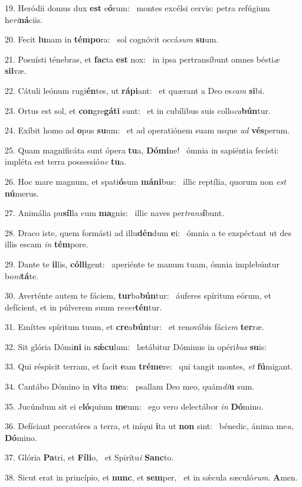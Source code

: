 19. Heródii domus dux \textbf{est} e\textbf{ó}rum: \ast\  montes excélsi cervis: petra refúgium he\textit{ri}\textbf{ná}ciis.\

20. Fecit \textbf{lu}nam in \textbf{tém}\textbf{po}ra: \ast\  sol cognóvit occá\textit{sum} \textbf{su}um.\

21. Posuísti ténebras, et \textbf{fac}ta \textbf{est} nox: \ast\  in ipsa pertransíbunt omnes bésti\textit{æ} \textbf{sil}væ.\

22. Cátuli leónum rugi\textbf{én}tes, ut \textbf{rá}\textbf{pi}ant: \ast\  et quærant a Deo es\textit{cam} \textbf{si}bi.\

23. Ortus est sol, et \textbf{con}gre\textbf{gá}\textbf{ti} sunt: \ast\  et in cubílibus suis collo\textit{ca}\textbf{bún}tur.\

24. Exíbit homo ad \textbf{o}pus \textbf{su}um: \ast\  et ad operatiónem suam usque \textit{ad} \textbf{vés}perum.\

25. Quam magnificáta sunt ópera \textbf{tu}a, \textbf{Dó}\textbf{mi}ne! \ast\  ómnia in sapiéntia fecísti: impléta est terra possessió\textit{ne} \textbf{tu}a.\

26. Hoc mare magnum, et spati\textbf{ó}sum \textbf{má}\textbf{ni}bus: \ast\  illic reptília, quorum non \textit{est} \textbf{nú}merus.\

27. Animália pu\textbf{síl}la cum \textbf{ma}gnis: \ast\  illic naves per\textit{trans}\textbf{í}bunt.\

28. Draco iste, quem formásti ad illu\textbf{dén}dum \textbf{e}i: \ast\  ómnia a te exspéctant ut des illis escam \textit{in} \textbf{tém}pore.\

29. Dante te \textbf{il}lis, \textbf{cól}\textbf{li}gent: \ast\  aperiénte te manum tuam, ómnia implebúntur bo\textit{ni}\textbf{tá}te.\

30. Averténte autem te fáciem, \textbf{tur}ba\textbf{bún}tur: \ast\  áuferes spíritum eórum, et defícient, et in púlverem suum re\textit{ver}\textbf{tén}tur.\

31. Emíttes spíritum tuum, et \textbf{cre}a\textbf{bún}tur: \ast\  et renovábis fáci\textit{em} \textbf{ter}ræ.\

32. Sit glória Dómi\textbf{ni} in \textbf{sǽ}\textbf{cu}lum: \ast\  lætábitur Dóminus in opéri\textit{bus} \textbf{su}is:\

33. Qui réspicit terram, et facit \textbf{e}am \textbf{tré}\textbf{me}re: \ast\  qui tangit montes, \textit{et} \textbf{fú}migant.\

34. Cantábo Dómino in \textbf{vi}ta \textbf{me}a: \ast\  psallam Deo meo, quám\textit{di}\textbf{u} sum.\

35. Jucúndum sit ei e\textbf{ló}quium \textbf{me}um: \ast\  ego vero delectábor \textit{in} \textbf{Dó}mino.\

36. Defíciant peccatóres a terra, et iníqui \textbf{i}ta ut \textbf{non} sint: \ast\  bénedic, ánima me\textit{a}, \textbf{Dó}mino.\

37. Glória \textbf{Pa}tri, et \textbf{Fí}\textbf{li}o, \ast\  et Spirítu\textit{i} \textbf{Sanc}to.\

38. Sicut erat in princípio, et \textbf{nunc}, et \textbf{sem}per, \ast\  et in sǽcula sæculó\textit{rum}. \textbf{A}men.\

